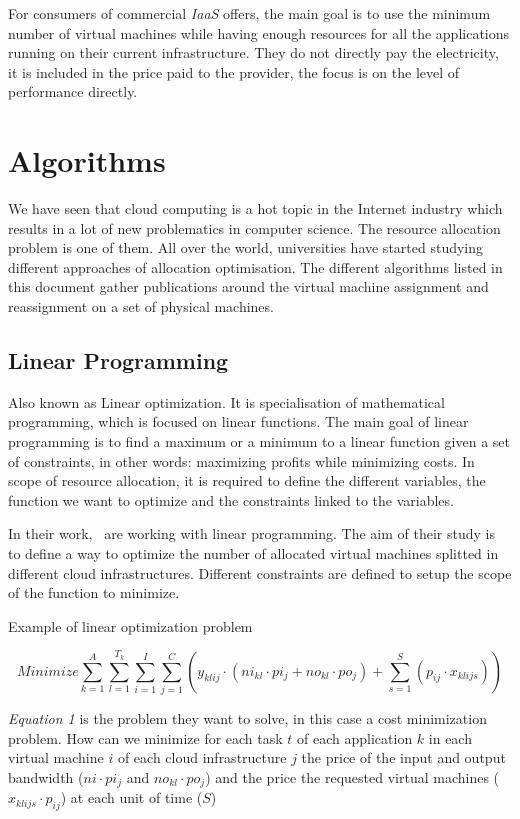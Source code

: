For consumers of commercial \textit{IaaS} offers, the main goal is to use the
minimum number of virtual machines while having enough resources for all the
applications running on their current infrastructure. They do not directly pay
the electricity, it is included in the price paid to the provider, the focus is
on the level of performance directly.

\section{Algorithms}

We have seen that cloud computing is a hot topic in the Internet industry
which results in a lot of new problematics in computer science. The resource
allocation problem is one of them. All over the world, universities have
started studying different approaches of allocation optimisation. The different
algorithms listed in this document gather publications around the virtual machine
assignment and reassignment on a set of physical machines.

\subsection{Linear Programming}

Also known as Linear optimization. It is specialisation of mathematical
programming, which is focused on linear functions. The main goal of linear
programming is to find a maximum or a minimum to a linear function given a set
of constraints, in other words: maximizing profits while minimizing costs. In
scope of resource allocation, it is required to define the different variables,
the function we want to optimize and the constraints linked to the variables.

In their work,~\cite*{allocationHybrid} are working with linear programming. The aim
of their study is to define a way to optimize the number of allocated virtual
machines splitted in different cloud infrastructures.  Different constraints
are defined to setup the scope of the function to minimize.

\begin{figequation}
	\caption{Example of linear optimization problem}
	\[
		Minimize
		\sum_{k=1}^A \sum_{l=1}^{T_k} \sum_{i=1}^I \sum_{j=1}^C ( y_{klij} \cdot (ni_{kl} \cdot {pi_j} + no_{kl} \cdot po_j) + \sum_{s=1}^S ( p_{ij} \cdot x_{klijs} ))
	\]
\end{figequation}

\textit{Equation 1} is the problem they want to solve, in this case a cost
minimization problem. How can we minimize for each task $t$ of each application
$k$ in each virtual machine $i$ of each cloud infrastructure $j$ the price of
the input and output bandwidth ($ni \cdot pi_j$ and $no_{kl} \cdot po_j$) and
the price the requested virtual machines ($x_{klijs} \cdot p_{ij}$) at each
unit of time ($S$)

